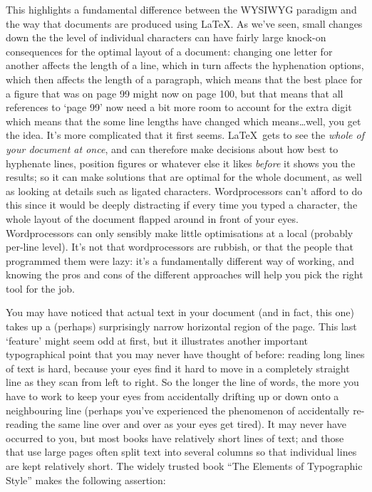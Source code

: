 This highlights a fundamental difference between the WYSIWYG para\-digm and the way that documents are produced using \LaTeX. As we've seen, small changes down the the level of individual characters can have fairly large knock-on consequences for the optimal layout of a document: changing one letter for another affects the length of a line, which in turn affects the hyphenation options, which then affects the length of a paragraph, which means that the best place for a figure that was on page 99 might now on page 100, but that means that all references to `page 99' now need a bit more room to account for the extra digit which means that the some line lengths have changed which means\ldots well, you get the idea. It's more complicated that it first seems. \LaTeX\ gets to see the \emph{whole of your document at once}, and can therefore make decisions about how best to hyphenate lines,  position figures or whatever else it likes \emph{before} it shows you the results; so it can make solutions that are optimal for the whole document, as well as looking at details such as ligated characters. Wordprocessors can't afford to do this since it would be deeply distracting if every time you typed a character, the whole layout of the document flapped around in front of your eyes. Wordprocessors can only sensibly make little optimisations at a local (probably per-line level). It's not that wordprocessors are rubbish, or that the people that programmed them were lazy: it's a fundamentally different way of working, and knowing the pros and cons of the different approaches will help you pick the right tool for the job. 

You may have noticed that actual text in your document (and in fact, this one) takes up a (perhaps) surprisingly narrow horizontal region of the page. This last `feature' might seem odd at first, but it illustrates another important typographical point that you may never have thought of before: reading long lines of text is hard, because your eyes find it hard to move in a completely straight line as they scan from left to right. So the longer the line of words, the more you have to work to keep your eyes from accidentally drifting up or down onto a neighbouring line (perhaps you've experienced the phenomenon of accidentally re-reading the same line over and over as your eyes get tired). It may never have occurred to you, but most books have relatively short lines of text; and those that use large pages often split text into several columns so that individual lines are kept relatively short. The widely trusted book ``The Elements of Typographic Style'' \citep{bringhurst92} makes the following assertion:


